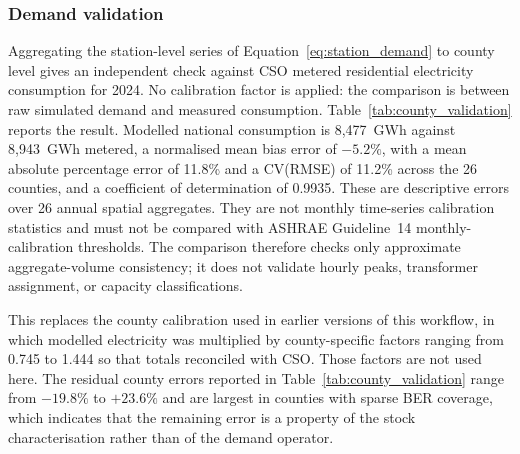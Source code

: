 \documentclass[preprint,12pt]{elsarticle}
\begin{document}
\subsubsection{Demand validation}
\label{sec:calibration}

Aggregating the station-level series of Equation~\eqref{eq:station_demand} to
county level gives an independent check against CSO metered residential
electricity consumption for 2024.
No calibration factor is applied: the comparison is between raw simulated
demand and measured consumption.
Table~\ref{tab:county_validation} reports the result.
Modelled national consumption is 8,477~GWh against 8,943~GWh metered, a
normalised mean bias error of $-5.2\%$, with a mean absolute percentage error
of 11.8\% and a CV(RMSE) of 11.2\% across the 26 counties, and a coefficient
of determination of 0.9935.
These are descriptive errors over 26 annual spatial aggregates. They are
not monthly time-series calibration statistics and must not be compared with
ASHRAE Guideline~14 monthly-calibration thresholds. The comparison therefore
checks only approximate aggregate-volume consistency; it does not validate
hourly peaks, transformer assignment, or capacity classifications.

This replaces the county calibration used in earlier versions of this
workflow, in which modelled electricity was multiplied by county-specific
factors ranging from 0.745 to 1.444 so that totals reconciled with CSO.
Those factors are not used here.
The residual county errors reported in
Table~\ref{tab:county_validation} range from $-19.8\%$ to $+23.6\%$ and are
largest in counties with sparse BER coverage, which indicates that the
remaining error is a property of the stock characterisation rather than of
the demand operator.
\end{document}
